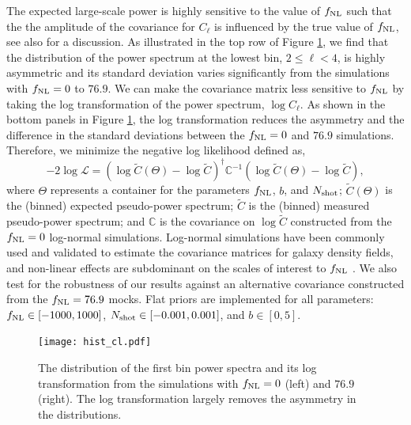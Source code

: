 The expected large-scale power is highly sensitive to the value of $f_{\rm NL}$ such that the the amplitude of the covariance for $C_{\ell}$ is influenced by the true value of $f_{\rm NL}$, see also \cite{2013MNRAS.428.1116R} for a discussion. As illustrated in the top row of Figure \ref{fig:histcell}, we find that the distribution of the power spectrum at the lowest bin, $2\leq \ell < 4$, is highly asymmetric and its standard deviation varies significantly from the simulations with $f_{\rm NL}=0$ to $76.9$. We can make the covariance matrix less sensitive to $f_{\rm NL}$ by taking the log transformation of the power spectrum, $\log C_{\ell}$. As shown in the bottom panels in Figure \ref{fig:histcell}, the log transformation reduces the asymmetry and the difference in the standard deviations between the $f_{\rm NL}=0$ and $76.9$ simulations. Therefore, we minimize the negative log likelihood defined as,
\begin{equation}\label{eq:likelihood}
-2\log \mathcal{L} = (\log \tilde{C}(\Theta)-\log \tilde{C})^{\dagger} \mathbb{C}^{-1} (\log \tilde{C}(\Theta)-\log \tilde{C}),
\end{equation}
where $\Theta$ represents a container for the parameters $f_{\rm NL}$, $b$, and $N_{\rm shot}$; $\tilde{C}(\Theta)$ is the (binned) expected pseudo-power spectrum; $\tilde{C}$ is the (binned) measured pseudo-power spectrum; and $\mathbb{C}$ is the covariance on $\log\tilde{C}$ constructed from the $f_{\rm NL}=0$ log-normal simulations. Log-normal simulations have been commonly used and validated to estimate the covariance matrices for galaxy density fields, and non-linear effects are subdominant on the scales of interest to $f_{\rm NL}$ \citep[see, e.g.,][]{2017MNRAS.466.1444C, 2021MNRAS.508.3125F}. We also test for the robustness of our results against an alternative covariance constructed from the $f_{\rm NL}=76.9$ mocks. Flat priors are implemented for all parameters: $f_{\rm NL} \in [-1000, 1000]$, $N_{\rm shot} \in [-0.001, 0.001]$, and $b \in [0, 5]$.

\begin{figure}
\centering
\texttt{[image: hist\_cl.pdf]}
\caption{The distribution of the first bin power spectra and its log transformation from the simulations with $f_{\rm NL}=0$ (left) and $76.9$ (right). The log transformation largely removes the asymmetry in the distributions.}\label{fig:histcell}
\end{figure}


